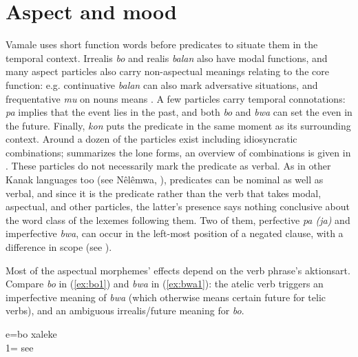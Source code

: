 \chapter{Aspect and mood} 
\label{ChapterAspect} 
Vamale uses short function words before predicates to situate them in the temporal context. Irrealis \textit{bo} and realis \textit{balan} also have modal functions, and many aspect particles also carry non-aspectual meanings relating to the core function: e.g. continuative \textit{balan} can also mark adversative situations, and frequentative \textit{mu} on nouns means . A few particles carry temporal connotations: \textit{pa}  implies that the event lies in the past, and both \textit{bo}  and \textit{bwa}  can set the even in the future. Finally, \textit{kon}  puts the predicate in the same moment as its surrounding context. Around a dozen of the particles exist including idiosyncratic combinations;  summarizes the lone forms, an overview of combinations is given in . These particles %
do not necessarily mark the predicate as verbal. As in other Kanak languages too (see Nêlêmwa, \citealt[89]{bril_nelemwa_2002}), predicates can be nominal as well as verbal, and since it is the predicate rather than the verb that takes modal, aspectual, and other particles, the latter's presence says nothing conclusive about the word class of the lexemes following them. Two of them, perfective \textit{pa (ja)} and imperfective \textit{bwa}, can occur in the left-most position of a negated clause, with a difference in scope (see ).

Most of the aspectual morphemes' effects depend on the verb phrase's aktionsart. Compare \textit{bo}  in (\ref{ex:bo1}) and \textit{bwa}  in (\ref{ex:bwa1}): the atelic verb triggers an imperfective meaning of \textit{bwa} (which otherwise means certain future for telic verbs), and an ambiguous irrealis/future meaning for \textit{bo}.

\ea%
%
%
\label{ex:bo1}
\gll e={bo} xaleke\\
 1= see\\
\glt {}
\z

